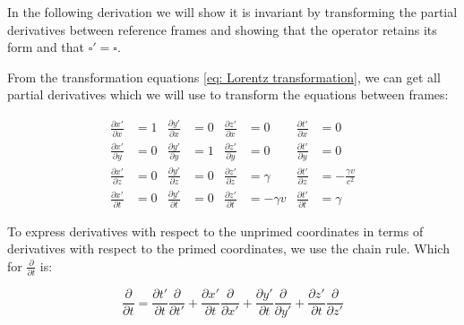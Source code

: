 In the following derivation we will show it is invariant by transforming the partial derivatives between reference frames and showing that the operator retains its form and that $\square'=\square$.


\begin{derivation}

	From the transformation equations \eqref{eq: Lorentz transformation}, we can get all partial derivatives which we will use to transform the equations between frames:

	\begin{equation}
		\begin{aligned}
			\frac{\partial x'}{\partial x} & = 1 & \frac{\partial y'}{\partial x} & = 0 & \frac{\partial z'}{\partial x} & = 0         & \frac{\partial t'}{\partial x} & = 0                     \\
			\frac{\partial x'}{\partial y} & = 0 & \frac{\partial y'}{\partial y} & = 1 & \frac{\partial z'}{\partial y} & = 0         & \frac{\partial t'}{\partial y} & = 0                     \\
			\frac{\partial x'}{\partial z} & = 0 & \frac{\partial y'}{\partial z} & = 0 & \frac{\partial z'}{\partial z} & = \gamma    & \frac{\partial t'}{\partial z} & = -\frac{\gamma v}{c^2} \\
			\frac{\partial x'}{\partial t} & = 0 & \frac{\partial y'}{\partial t} & = 0 & \frac{\partial z'}{\partial t} & = -\gamma v & \frac{\partial t'}{\partial t} & = \gamma
		\end{aligned}
	\end{equation}

	To express derivatives with respect to the unprimed coordinates in terms of derivatives with respect to the primed coordinates, we use the chain rule.
	Which for $\frac{\partial}{\partial t}$ is:

	\begin{equation}
		\frac{\partial}{\partial t} = \frac{\partial t'}{\partial t}\frac{\partial}{\partial t'} + \frac{\partial x'}{\partial t}\frac{\partial}{\partial x'} + \frac{\partial y'}{\partial t}\frac{\partial}{\partial y'} + \frac{\partial z'}{\partial t}\frac{\partial}{\partial z'}
	\end{equation}


\end{derivation}
